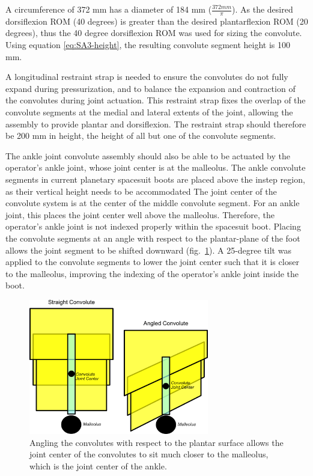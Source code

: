 \documentclass[defaultstyle,11pt]{thesis}
\begin{document}
A circumference of 372 mm has a diameter of 184 mm (\(\frac{372mm}{\pi}\)).
As the desired dorsiflexion ROM (40 degrees) is greater than the desired plantarflexion ROM (20 degrees), thus the 40 degree dorsiflexion ROM was used for sizing the convolute.
Using equation \ref{eq:SA3-height}, the resulting convolute segment height is 100 mm.

A longitudinal restraint strap is needed to ensure the convolutes do not fully expand during pressurization, and to balance the expansion and contraction of the convolutes during joint actuation.
This restraint strap fixes the overlap of the convolute segments at the medial and lateral extents of the joint, allowing the assembly to provide plantar and dorsiflexion.
The restraint strap should therefore be 200 mm in height, the height of all but one of the convolute segments.

The ankle joint convolute assembly should also be able to be actuated by the operator's ankle joint, whose joint center is at the malleolus.
The ankle convolute segments in current planetary spacesuit boots are placed above the instep region, as their vertical height needs to be accommodated
The joint center of the convolute system is at the center of the middle convolute segment.
For an ankle joint, this places the joint center well above the malleolus.
Therefore, the operator's ankle joint is not indexed properly within the spacesuit boot.
Placing the convolute segments at an angle with respect to the plantar-plane of the foot allows the joint segment to be shifted downward (fig.~\ref{fig:SA3-convolute_ang}).
A 25-degree tilt was applied to the convolute segments to lower the joint center such that it is closer to the malleolus, improving the indexing of the operator's ankle joint inside the boot.

\hypertarget{fig:SA3-convolute_ang}{%
\begin{figure}
\centering
\includegraphics[width=0.7\textwidth,height=\textheight]{../fig/SA3/Convolute_Angled.png}
\caption[{Result of angling convolutes with respect to plantar surface.}]{Angling the convolutes with respect to the plantar surface allows the joint center of the convolutes to sit much closer to the malleolus, which is the joint center of the ankle.}
\label{fig:SA3-convolute_ang}
\end{figure}
}
\end{document}

